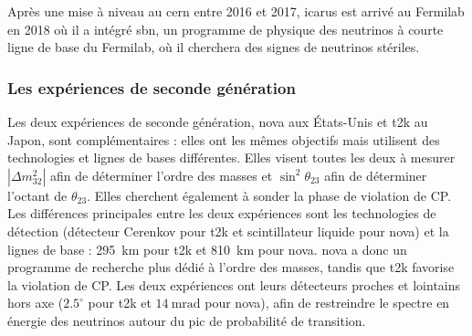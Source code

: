         Après une mise à niveau au \gls{cern} entre 2016 et 2017, \gls{icarus} est arrivé au Fermilab en 2018 où il a intégré \gls{sbn}, un programme de physique des neutrinos à courte ligne de base du Fermilab, où il cherchera des signes de neutrinos stériles.

      \subsubsection{Les expériences de seconde génération}

        Les deux expériences de seconde génération, \gls{nova} aux États-Unis et \gls{t2k} au Japon, sont complémentaires : elles ont les mêmes objectifs mais utilisent des technologies et lignes de bases différentes.  Elles visent toutes les deux à mesurer $|\Delta m_{32}^2|$ afin de déterminer l'ordre des masses et $\sin^2{\theta_{23}}$ afin de déterminer l'octant de $\theta_{23}$. Elles cherchent également à sonder la phase de violation de CP. Les différences principales entre les deux expériences sont les technologies de détection (détecteur Cerenkov pour \gls{t2k} et scintillateur liquide pour \gls{nova}) et la lignes de base : \SI{295}{\kilo\meter} pour \gls{t2k} et \SI{810}{\kilo\meter} pour \gls{nova}. \gls{nova} a donc un programme de recherche plus dédié à l'ordre des masses, tandis que \gls{t2k} favorise la violation de CP. Les deux expériences ont leurs détecteurs proches et lointains hors axe ($2.5^{\circ}$ pour \gls{t2k} et $\SI{14}{\milli\radian}$ pour \gls{nova}), afin de restreindre le spectre en énergie des neutrinos autour du pic de probabilité de transition.
        
